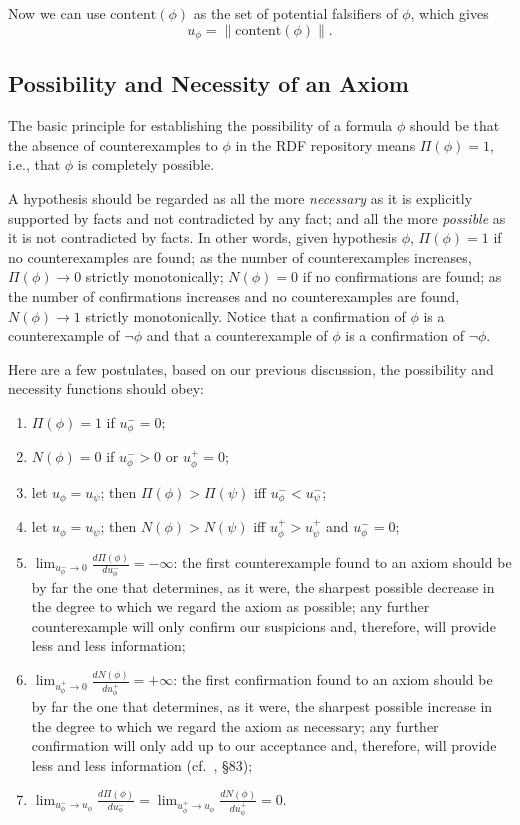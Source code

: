 \documentclass{llncs}
\begin{document}
Now we can use $\mathrm{content}(\phi)$ as the set of potential falsifiers of $\phi$,
which gives
\begin{equation}\label{eq:content2}
    u_\phi = \|\mathrm{content}(\phi)\|.
\end{equation}
\noindent


\subsection{Possibility and Necessity of an Axiom}

The basic principle for establishing the possibility of a formula $\phi$ should be
that the absence of counterexamples to $\phi$ in the RDF repository means $\Pi(\phi) = 1$,
i.e., that $\phi$ is completely possible.

A hypothesis should be regarded as all the more
\emph{necessary} as it is explicitly supported by facts and not contradicted by any fact;
and all the more \emph{possible} as it is not contradicted by facts.
In other words, given hypothesis $\phi$, $\Pi(\phi) = 1$ if no counterexamples are found;
as the number of counterexamples increases, $\Pi(\phi) \to 0$ strictly monotonically;
$N(\phi) = 0$ if no confirmations are found; as the number of confirmations increases
and no counterexamples are found, $N(\phi) \to 1$ strictly monotonically.
Notice that a confirmation of $\phi$ is a counterexample of $\neg\phi$
and that a counterexample of $\phi$ is a confirmation of $\neg\phi$.

Here are a few postulates, based on our previous discussion, the possibility
and necessity functions should obey:
\begin{enumerate}
\item $\Pi(\phi) = 1$ if $u_\phi^- = 0$;
\item $N(\phi) = 0$ if $u_\phi^- > 0$ or $u_\phi^+ = 0$;
\item let $u_\phi = u_\psi$; then $\Pi(\phi) > \Pi(\psi)$ iff $u_\phi^- < u_\psi^-$;
\item let $u_\phi = u_\psi$; then $N(\phi) > N(\psi)$ iff $u_\phi^+ > u_\psi^+$ and $u_\phi^- = 0$;
\item $\lim_{u_\phi^-\to0}\frac{d\Pi(\phi)}{du_\phi^-} = -\infty$:
  the first counterexample found to an axiom should be by far the one that determines, as it were,
  the sharpest possible decrease in the degree to which we regard the axiom as possible; any further
  counterexample will only confirm our suspicions and, therefore, will provide less and less
  information;
\item $\lim_{u_\phi^+\to0}\frac{dN(\phi)}{du_\phi^+} = +\infty$:
  the first confirmation found to an axiom should be by far the one that determines, as it were,
  the sharpest possible increase in the degree to which we regard the axiom as necessary; any further
  confirmation will only add up to our acceptance and, therefore, will provide less and less
  information (cf.\ \cite{Popper1935}, \S83);
\item $\lim_{u_\phi^-\to u_\phi}\frac{d\Pi(\phi)}{du_\phi^-} = \lim_{u_\phi^+\to u_\phi}\frac{dN(\phi)}{du_\phi^+} = 0$.
\end{enumerate}
\end{document}
